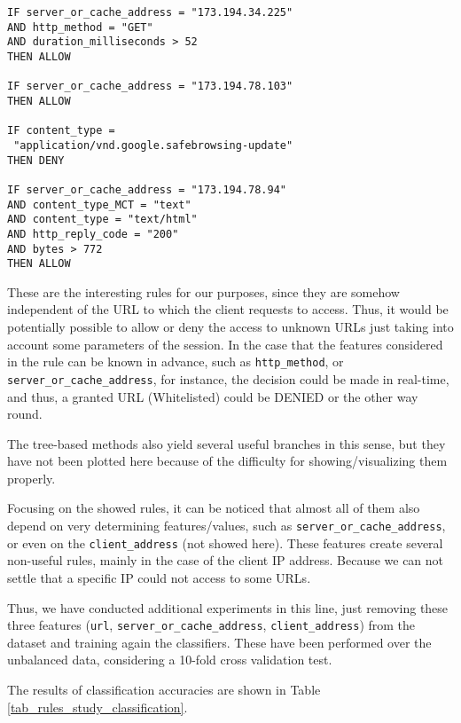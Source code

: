 \documentclass{llncs}
\begin{document}
\begin{small}
\begin{verbatim}
IF server_or_cache_address = "173.194.34.225"
AND http_method = "GET"
AND duration_milliseconds > 52
THEN ALLOW

IF server_or_cache_address = "173.194.78.103" 
THEN ALLOW

IF content_type = 
 "application/vnd.google.safebrowsing-update" 
THEN DENY

IF server_or_cache_address = "173.194.78.94" 
AND content_type_MCT = "text"
AND content_type = "text/html"
AND http_reply_code = "200"
AND bytes > 772
THEN ALLOW
\end{verbatim}
\end{small}

These are the interesting rules for our purposes, since they are somehow independent of the URL to which the client requests to access. Thus, it would be potentially possible to allow or deny the access to unknown URLs just taking into account some parameters of the session.
In the case that the features considered in the rule can be known in advance, such as \texttt{http\_method}, or \texttt{server\_or\_cache\_address}, for instance, the decision could be made in real-time, and thus, a granted URL (Whitelisted) could be DENIED or the other way round.

The tree-based methods also yield several useful branches in this sense, but they have not been plotted here because of the difficulty for showing/visualizing them properly.

Focusing on the showed rules, it can be noticed that almost all of them also depend on very determining features/values, such as \texttt{server\_or\_cache\_address}, or even on the \texttt{client\_address} (not showed here).
These features create several non-useful rules, mainly in the case of the client IP address. Because we can not settle that a specific IP could not access to some URLs.

Thus, we have conducted additional experiments in this line, just removing these three features (\texttt{url}, \texttt{server\_or\_cache\_address}, \texttt{client\_address}) from the dataset and training again the classifiers.
These have been performed over the unbalanced data, considering a 10-fold cross validation test.

The results of classification accuracies are shown in Table \ref{tab_rules_study_classification}.
\end{document}
